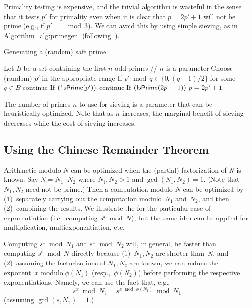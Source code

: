 \documentclass[11pt]{article}
\newcommand{\?}[1]{\stackrel{?}{#1}}
\begin{document}
Primality testing is expensive, and the trivial algorithm is wasteful in the sense that it tests $p'$ for primality even when it is clear that $p=2p'+1$ will not be prime (e.g., if $p'=1 \bmod 3$).
We can avoid this by using simple sieving, as in Algorithm~\ref{alg:primegen} (following~\cite{safe-primes}).

\begin{algorithm}
\caption{Generating a (random) safe prime}\label{alg:primegen}
\begin{algorithmic}[1]
\State Let $B$ be a set containing the first $n$ odd primes \;\;\; // $n$ is a parameter
\State Choose (random) $p'$ in the appropriate range
\State If $p' \bmod q \in \{0, (q-1)/2\}$ for some $q \in B$ {\sf continue}
\State If $(!{\sf IsPrime}(p'))$ {\sf continue}
\State If $({\sf IsPrime}(2p'+1))$ \Return $p=2p'+1$
\EndWhile
\end{algorithmic}
\end{algorithm}

The number of primes $n$ to use for sieving is a parameter that can be heuristically optimized. Note that as $n$ increases, the marginal benefit of sieving decreases while the cost of sieving increases.

\subsection{Using the Chinese Remainder Theorem}
\label{sec:CRT}
Arithmetic modulo $N$ can be optimized when the (partial) factorization of $N$ is known.
Say $N=N_1\cdot N_2$ where $N_1, N_2 > 1$ and $\gcd(N_1, N_2)=1$. (Note that $N_1, N_2$ need not be prime.)
Then a computation modulo $N$ can be optimized by (1)~separately carrying out the computation modulo~$N_1$ and~$N_2$, and then (2)~combining the results.
We illustrate the for the particular case of exponentiation (i.e., computing
$s^x \bmod N$), but the same idea can be applied for multiplication, multiexponentiation, etc.

\medskip{}
Computing $s^x \bmod N_1$ and $s^x \bmod N_2$ will, in general, be faster than computing $s^x \bmod N$ directly because (1)~$N_1, N_2$ are shorter than~$N$, and (2)~assuming the factorizations of $N_1, N_2$ are known, we can reduce the exponent~$x$ modulo $\phi(N_1)$ (resp.,~$\phi(N_2)$) before performing the respective exponentiations.
Namely, we can use the fact that, e.g., 
\[s^x \bmod N_1 = s^{x \bmod \phi(N_1)} \bmod N_1\]
(assuming $\gcd(s, N_1)=1$.)
\end{document}
